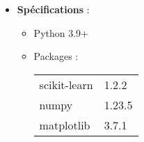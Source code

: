 \documentclass[a4paper, 12pt]{article}
\begin{document}
\begin{itemize}
\begin{itemize}
    \item \textbf{Spécifications} :
    \begin{itemize}
        \item[{\textbullet}] Python 3.9+ 
        \item[{\textbullet}] Packages : 
        \begin{tabular}{@{}ll@{}}
            scikit-learn & 1.2.2 \\
            numpy & 1.23.5 \\
            matplotlib & 3.7.1 \\
        \end{tabular}
    \end{itemize}
\end{itemize}

\begin{center}
\end{center}
\end{itemize}  
\end{document}
